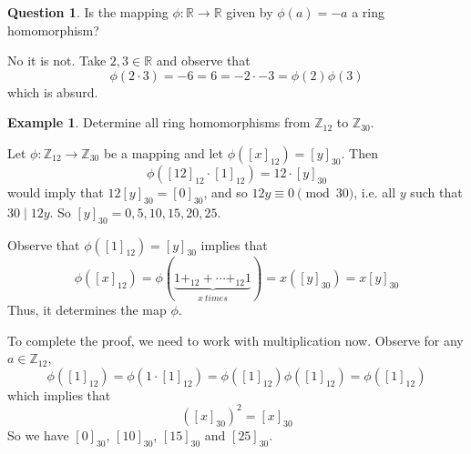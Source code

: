 \documentclass[11pt]{article}
\theoremstyle{definition}\newtheorem{definition}{Definition}
\theoremstyle{definition}\newtheorem*{notation}{Notation}
\theoremstyle{definition}\newtheorem{example}{Example}
\theoremstyle{theorem}\newtheorem{theorem}{Theorem}
\theoremstyle{theorem}\newtheorem{corollary}{Corollary}
\theoremstyle{theorem}\newtheorem{proposition}{Proposition}
\theoremstyle{theorem}\newtheorem{lemma}{Lemma}
\theoremstyle{theorem}\newtheorem{question}{Question}
\theoremstyle{remark}\newtheorem{remark}{Remark}
\newcommand{\R}{\mathbb{R}}
\newcommand{\Z}{\mathbb{Z}}
\begin{document}
\begin{question}
    Is the mapping $\phi : \R \to \R$ given by $\phi(a) = -a$ a ring homomorphism?
\end{question}

No it is not. Take $2, 3 \in \R$ and observe that
\begin{equation*}
    \phi(2 \cdot 3) = -6 = 6 = -2 \cdot -3 = \phi(2)\phi(3)
\end{equation*}
which is absurd.

\begin{example}
    Determine all ring homomorphisms from $\Z_{12}$ to $\Z_{30}$.

    Let $\phi : \Z_{12} \to \Z_{30}$ be a mapping and let $\phi([x]_{12}) = [y]_{30}$. Then
    \begin{equation*}
        \phi([12]_{12} \cdot [1]_{12}) = 12 \cdot [y]_{30}
    \end{equation*}
    would imply that $12 [y]_{30} = [0]_{30}$, and so $12y \equiv 0 \pmod {30}$, i.e. all $y$ such that $30 \mid 12y$. So $[y]_{30} = 0, 5, 10, 15, 20, 25$.

    Observe that $\phi([1]_{12}) = [y]_{30}$ implies that
    \begin{equation*}
        \phi([x]_{12}) = \phi(\underbrace{1 +_{12} + \cdots +_{12} 1}_{x \ times}) = x ([y]_{30}) = x[y]_{30}
    \end{equation*}
    Thus, it determines the map $\phi$.

    To complete the proof, we need to work with multiplication now. Observe for any $a \in \Z_{12}$,
    \begin{equation*}
        \phi([1]_{12}) = \phi(1 \cdot [1]_{12}) = \phi([1]_{12}) \phi([1]_{12}) = \phi([1]_{12})
    \end{equation*}
    which implies that
    \begin{equation*}
        ([x]_{30})^2 = [x]_{30}
    \end{equation*}
    So we have $[0]_{30}$, $[10]_{30}$, $[15]_{30}$ and $[25]_{30}$.
\end{example}
\end{document}
